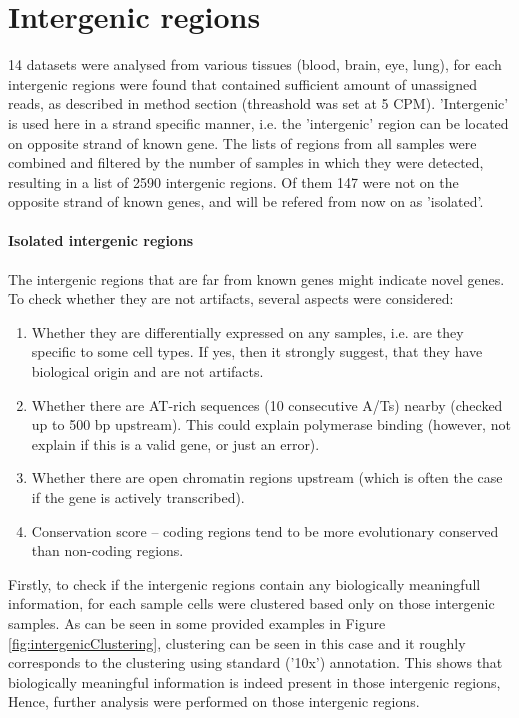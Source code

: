 \section{Intergenic regions}

14 datasets were analysed from various tissues (blood, brain, eye, lung), 
for each  intergenic regions were found that contained sufficient amount of unassigned reads,
as described in method section (threashold was set at 5 CPM).
'Intergenic' is used here in a strand specific manner, i.e. the 'intergenic' region can be located on opposite strand of known gene.
The lists of regions from all samples were combined and filtered by the number of samples in which they were detected,
resulting in a list of 2590 intergenic regions.
Of them 147 were not on the opposite strand of known genes, and will be refered from now on as 'isolated'.

\paragraph{Isolated intergenic regions}

The intergenic regions that are far from known genes might indicate novel genes.
To check whether they are not artifacts, several aspects were considered:
\begin{enumerate}
  \item Whether they are differentially expressed on any samples, i.e. are they specific to some cell types.
  If yes, then it strongly suggest, that they have biological origin and are not artifacts.
  \item Whether there are AT-rich sequences (10 consecutive A/Ts) nearby (checked up to 500 bp upstream).
  This could explain polymerase binding (however, not explain if this is a valid gene, or just an error).
  \item Whether there are open chromatin regions upstream (which is often the case if the gene is actively transcribed).
  \item Conservation score – coding regions tend to be more evolutionary conserved than non-coding regions.
\end{enumerate}

Firstly, to check if the intergenic regions contain any biologically meaningfull information,
for each sample cells were clustered based only on those intergenic samples.
As can be seen in some provided examples in Figure \ref{fig:intergenicClustering},
clustering can be seen in this case and it roughly corresponds to the clustering using standard ('10x') annotation.
This shows that biologically meaningful information is indeed present in those intergenic regions,
Hence, further analysis were performed on those intergenic regions.

